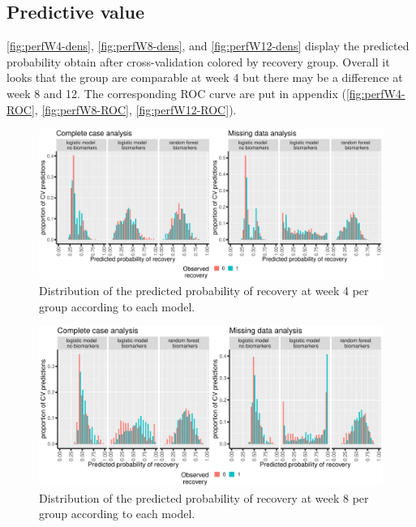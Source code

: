 \documentclass[12pt]{article}
\begin{document}
\subsection{Predictive value}
\label{sec:orgb0db47d}

\autoref{fig:perfW4-dens}, \autoref{fig:perfW8-dens}, and
\autoref{fig:perfW12-dens} display the predicted probability obtain
after cross-validation colored by recovery group. Overall it looks
that the group are comparable at week 4 but there may be a difference
at week 8 and 12. The corresponding ROC curve are put in appendix
(\autoref{fig:perfW4-ROC}, \autoref{fig:perfW8-ROC},
\autoref{fig:perfW12-ROC}).

\begin{figure}[!h]
\centering
\includegraphics[trim={0 0 0 0},width=\textwidth]{./figures/hist-pred-week4.pdf}
\caption{\label{fig:perfW4-dens}Distribution of the predicted probability of recovery at week 4 per group according to each model.}
\end{figure}

\clearpage

\begin{figure}[!h]
\centering
\includegraphics[trim={0 0 0 0},width=\textwidth]{./figures/hist-pred-week8.pdf}
\caption{\label{fig:perfW8-dens}Distribution of the predicted probability of recovery at week 8 per group according to each model.}
\end{figure}
\end{document}
